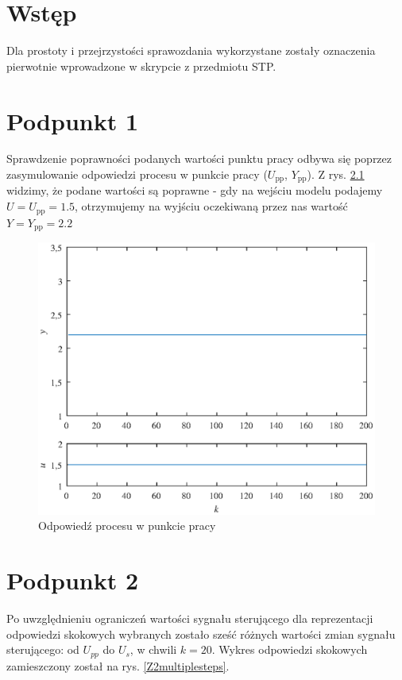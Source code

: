 \chapter{Wstęp}
Dla prostoty i przejrzystości sprawozdania wykorzystane zostały oznaczenia pierwotnie wprowadzone w skrypcie z przedmiotu STP.

\chapter{Podpunkt 1}
Sprawdzenie poprawności podanych wartości punktu pracy odbywa się poprzez zasymulowanie odpowiedzi procesu w punkcie pracy ($U_{\mathrm{pp}}$, $Y_{\mathrm{pp}}$). Z rys. \ref{Z1} widzimy, że podane wartości są poprawne - gdy na wejściu modelu podajemy $U=U_{\mathrm{pp}}=\num{1,5}$, otrzymujemy na wyjściu oczekiwaną przez nas wartość $Y=Y_{\mathrm{pp}}=\num{2,2}$

\begin{figure}[ht]
\centering
\includegraphics[scale=1]{images/Z1}
\caption{Odpowiedź procesu w punkcie pracy}
\label{Z1}
\end{figure}


\chapter{Podpunkt 2}
Po uwzględnieniu ograniczeń wartości sygnału sterującego dla reprezentacji odpowiedzi skokowych wybranych zostało sześć różnych wartości zmian sygnału sterującego: od $U_{pp}$ do $U_s$, w chwili $k=20$. Wykres odpowiedzi skokowych zamieszczony został na rys. \ref{Z2multiplesteps}.


